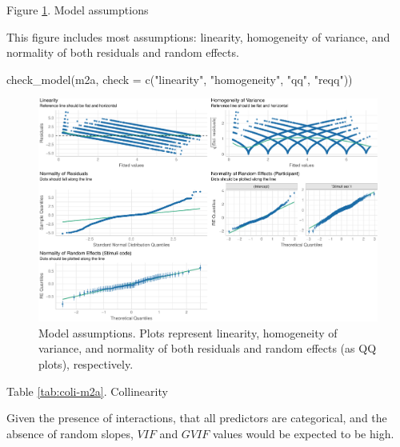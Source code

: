 \documentclass[
  bookmarksnumbered]{article}
\newenvironment{Shaded}{\begin{snugshade}}{\end{snugshade}}
\newcommand{\AttributeTok}[1]{\textcolor[rgb]{0.80,0.80,0.80}{#1}}
\newcommand{\FunctionTok}[1]{\textcolor[rgb]{0.94,0.94,0.56}{#1}}
\newcommand{\NormalTok}[1]{\textcolor[rgb]{0.80,0.80,0.80}{#1}}
\newcommand{\StringTok}[1]{\textcolor[rgb]{0.80,0.58,0.58}{#1}}
\begin{document}
Figure \ref{fig:assu-m2a}. Model assumptions

This figure includes most assumptions: linearity, homogeneity of variance, and normality of both residuals and random effects.

\begin{Shaded}
\begin{Highlighting}[]
\FunctionTok{check\_model}\NormalTok{(m2a,}
            \AttributeTok{check =} \FunctionTok{c}\NormalTok{(}\StringTok{"linearity"}\NormalTok{, }\StringTok{"homogeneity"}\NormalTok{, }\StringTok{"qq"}\NormalTok{, }\StringTok{"reqq"}\NormalTok{))}
\end{Highlighting}
\end{Shaded}

\begin{figure}
\centering
\includegraphics{Deseo_excitacion_sexual_files/figure-latex/assu-m2a-1.pdf}
\caption{\label{fig:assu-m2a}Model assumptions. Plots represent linearity, homogeneity of variance, and normality of both residuals and random effects (as QQ plots), respectively.}
\end{figure}

Table \ref{tab:coli-m2a}. Collinearity

Given the presence of interactions, that all predictors are categorical, and the absence of random slopes, \(VIF\) and \(GVIF\) values would be expected to be high.
\end{document}

